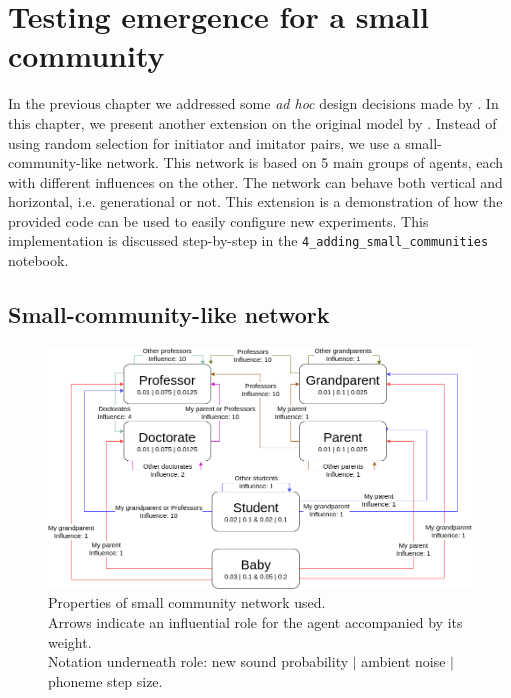 \chapter{Testing emergence for a small community}
\label{ch:extension}

In the previous chapter we addressed some \textit{ad hoc} design decisions made by \citet{deBoer2000}.
In this chapter, we present another extension on the original model by \citet{deBoer2000}.
Instead of using random selection for initiator and imitator pairs, we use a small-community-like network.
This network is based on 5 main groups of agents, each with different influences on the other.
The network can behave both vertical and horizontal, i.e. generational or not.
This extension is a demonstration of how the provided code can be used to easily configure new experiments.
This implementation is discussed step-by-step in the \texttt{4\_adding\_small\_communities} notebook.


\section{Small-community-like network}
\label{sec:network_idea}

\begin{figure}[H]
    \centering
    \includegraphics[width=\linewidth]{images/extension/network.png}
    \captionsetup{width=\linewidth}
    \captionsetup{justification=centering}
    \caption{Properties of small community network used.\\Arrows indicate an influential role for the agent accompanied by its weight.\\Notation underneath role: new sound probability $|$ ambient noise $|$ phoneme step size.}
    \label{fig:network}
\end{figure}

